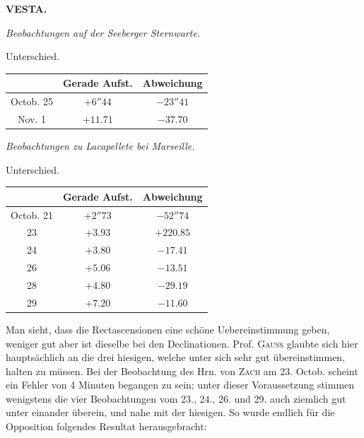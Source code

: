 \clearpage
\thispagestyle{empty}
\noindent{}%
\makebox[12mm][l]{}%
\parbox[t]{\dimexpr\linewidth-24mm\relax}{\centering\footnotesize\bfseries VESTA.\par}%
\par\nobreak\medskip
\begin{center}
\emph{Beobachtungen auf der Seeberger Sternwarte.}\par
Unterschied.

\fontsize{10}{12}\selectfont\setlength{\tabcolsep}{7pt}\renewcommand{\arraystretch}{1.15}\begin{tabular}{|c|c|c|}
\hline
 & Gerade Aufst. & Abweichung \\
\hline
Octob. 25 & $+6''44$ & $-23''41$ \\
Nov. 1 & $+11.71$ & $-37.70$ \\
\hline
\end{tabular}
\end{center}

\medskip
{}\begin{center}
\emph{Beobachtungen zu Lacapellete bei Marseille.}\par
Unterschied.

\fontsize{10}{12}\selectfont\setlength{\tabcolsep}{7pt}\renewcommand{\arraystretch}{1.15}\begin{tabular}{|c|c|c|}
\hline
 & Gerade Aufst. & Abweichung \\
\hline
Octob. 21 & $+2''73$ & $-52''74$ \\
23 & $+3.93$ & $+220.85$ \\
24 & $+3.80$ & $-17.41$ \\
26 & $+5.06$ & $-13.51$ \\
28 & $+4.80$ & $-29.19$ \\
29 & $+7.20$ & $-11.60$ \\
\hline
\end{tabular}
\end{center}

\par\indent Man sieht, dass die Rectascensionen eine schöne Uebereinstimmung geben, weniger gut aber ist dieselbe
bei den Declinationen. Prof. \textsc{Gauss} glaubte sich hier hauptsächlich an die drei hiesigen, welche unter
sich sehr gut übereinstimmen, halten zu müssen. Bei der Beobachtung des Hrn. von \textsc{Zach} am 23. Octob.
scheint ein Fehler von 4 Minuten begangen zu sein; unter dieser Voraussetzung stimmen wenigstens die
vier Beobachtungen vom 23., 24., 26. und 29. auch ziemlich gut unter einander überein, und nahe mit
der hiesigen. So wurde endlich für die Opposition folgendes Resultat herausgebracht:

